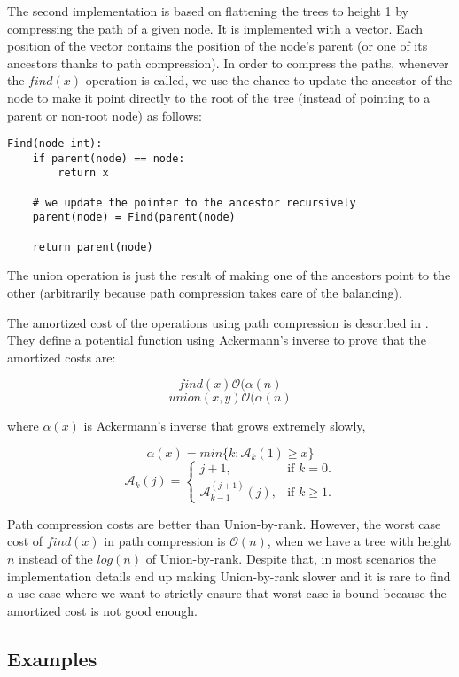 \documentclass[a4paper,10pt,table,xcdraw]{article}
\begin{document}
The second implementation is based on flattening the trees to height 1 by compressing the path of a given node. It is implemented with a vector. Each position of the vector contains the position of the node's parent (or one of its ancestors thanks to path compression). In order to compress the paths, whenever the $find(x)$ operation is called, we use the chance to update the ancestor of the node to make it point directly to the root of the tree (instead of pointing to a parent or non-root node) as follows:

\begin{verbatim}
Find(node int):
    if parent(node) == node:
        return x
	
    # we update the pointer to the ancestor recursively
    parent(node) = Find(parent(node)
    
    return parent(node)

\end{verbatim}

The union operation is just the result of making one of the ancestors point to the other (arbitrarily because path compression takes care of the balancing).

The amortized cost of the operations using path compression is described in \cite{Harfst}. They define a potential function using Ackermann's inverse to prove that the amortized costs are:

\[ find(x) \mathcal{O} ( \alpha (n) \]
\[union(x, y) \mathcal{O} ( \alpha (n)\]

where $\alpha (x)$ is Ackermann's inverse that grows extremely slowly, 

\[ \alpha (x) = min \{ k: \mathcal{A}_k (1) \geq x \} \]
\[ \mathcal{A}_k (j) = \begin{cases}
    j + 1, & \text{if $k=0$}.\\
    \mathcal{A}_{k-1}^{(j+1)} (j), & \text{if $k \geq 1$}.
  \end{cases}
\]

Path compression costs are better than Union-by-rank. However, the worst case cost of $find(x)$ in path compression is $\mathcal{O} (n)$, when we have a tree with height $n$ instead of the $log (n)$ of Union-by-rank. Despite that, in most scenarios the implementation details end up making Union-by-rank slower and it is rare to find a use case where we want to strictly ensure that worst case is bound because the amortized cost is not good enough.

\subsection{Examples}
\label{subsubsec:uf-examples} 
\end{document}
